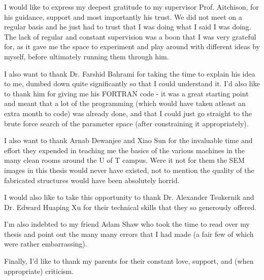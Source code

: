 \begin{singlespace}
I would like to express my deepest gratitude to my supervisor Prof. Aitchison, for his guidance, support and most importantly his trust. We did not meet on a regular basis and he just had to trust that I was doing what I said I was doing. The lack of regular and constant supervision was a boon that I was very grateful for, as it gave me the space to experiment and play around with different ideas by myself, before ultimately running them through him. 

I also want to thank Dr. Farshid Bahrami for taking the time to explain his idea to me, dumbed down quite significantly so that I could understand it. I'd also like to thank him for giving me his FORTRAN code - it was a great starting point and meant that a lot of the programming (which would have taken atleast an extra month to code) was already done, and that I could just go straight to the brute force search of the parameter space (after constraining it appropriately). 

I also want to thank Arnab Dewanjee and Xiao Sun for the invaluable time and effort they expended in teaching me the basics of the various machines in the many clean rooms around the U of T campus. Were it not for them the SEM images in this thesis would never have existed, not to mention the quality of the fabricated structures would have been absolutely horrid.

I would also like to take this opportunity to thank Dr. Alexander Tsukernik and Dr. Edward Huaping Xu for their technical skills that they so generously offered.

I'm also indebted to my friend Adam Shaw who took the time to read over my thesis and point out the many many errors that I had made (a fair few of which were rather embarrassing).

Finally, I'd like to thank my parents for their constant love, support, and (when appropriate) criticism. 
\end{singlespace}



\clearpage